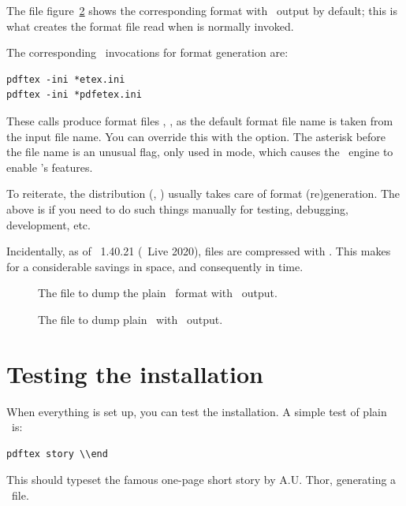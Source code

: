\documentclass{pdftexmanual}
\begin{document}
{The  file figure~\ref{fig.pdfetex.ini} shows the
corresponding format with \PDF\ output by default; this is what creates
the format file read when  is normally invoked.

The corresponding \PDFTEX\ invocations for format generation are:

\begin{verbatim}
pdftex -ini *etex.ini
pdftex -ini *pdfetex.ini
\end{verbatim}

These calls produce format files ,
, as the default format file name is taken from
the input file name. You can override this with the 
option. The asterisk \type{*} before the file name is an unusual flag,
only used in  mode, which causes the \PDFTEX\ engine to
enable \ETEX's features.

To reiterate, the distribution (\TEXLIVE, \MIKTEX) usually takes care of
format (re)generation. The above is if you need to do such things
manually for testing, debugging, development, etc.

Incidentally, as of \PDFTEX\ 1.40.21 (\TEX\ Live 2020), 
files are compressed with . This makes for a considerable
savings in space, and consequently in time.

\begin{figure}[t]
\caption{The  file to dump the plain \ETEX\ format with
         \DVI\ output.}
\label{fig.etex.ini}
\end{figure}

\begin{figure}[t]
\caption{The  file to dump plain \ETEX\ with \PDF\ output.}
\label{fig.pdfetex.ini}
\end{figure}

\section{Testing the installation}

When everything is set up, you can test the installation.  A simple test
of plain \PDFTEX\ is:

\begin{verbatim}
pdftex story \\end
\end{verbatim}

This should typeset the famous one-page short story by A.U. Thor,
generating a \PDF\ file.

}
\end{document}
